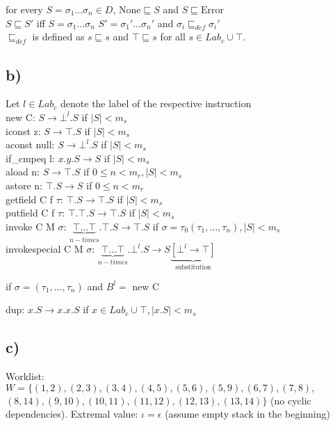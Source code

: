 \documentclass[fleqn,12pt]{article}
\begin{document}
for every $S=\sigma_1\dots\sigma_n \in D$, $\text{None} \sqsubseteq S$ and $S \sqsubseteq \text{Error}$\\
$S \sqsubseteq S'$ iff $S=\sigma_1\dots\sigma_n$ $S'=\sigma_1'\dots\sigma_n'$ and $\sigma_i \sqsubseteq_{def} \sigma_i'$\\
$\sqsubseteq_{def}$ is defined as $s \sqsubseteq s$ and $\top \sqsubseteq s$ for all $s \in Lab_c \cup \top$.
\subsection*{b)}
Let $l \in Lab_c$ denote the label of the respective instruction\\

new C: $S \rightarrow \bot^l.S$ if $|S| < m_s$\\
iconst z: $S \rightarrow \top.S$ if $|S| < m_s$\\
aconst null: $S \rightarrow \bot^l.S$ if $|S| < m_s$\\
if\_cmpeq l: $x.y.S \rightarrow S$ if $|S| < m_s$\\
aload n: $S \rightarrow \top.S$ if $0\leq n < m_r, |S| < m_s$\\
astore n: $\top.S \rightarrow S$ if $0\leq n < m_r$\\
getfield C f $\tau$: $\top.S \rightarrow \top.S$ if $|S| < m_s$\\
putfield C f $\tau$: $\top.\top.S \rightarrow \top.S$ if $|S| < m_s$ \\
invoke C M $\sigma$: $\underbrace{\top\dots\top}_{n-times}.\top.S \rightarrow \top.S$ if $\sigma = \tau_0(\tau_1,\dots,\tau_n),|S| < m_s$\\
invokespecial C M $\sigma$: $\underbrace{\top\dots\top}_{n-times}.\bot^l.S \rightarrow S\underbrace{[\bot^l \rightarrow \top]}_{\text{substitution}}$ 
\begin{flushright}
if $\sigma = (\tau_1,\dots,\tau_n)$ and $B^l =$ new C
\end{flushright}
dup: $x.S \rightarrow x.x.S$ if $x \in Lab_c \cup \top, |x.S| < m_s$\\
\subsection*{c)}
Worklist: $W = \{ (1,2),(2,3),(3,4),(4,5),(5,6),(5,9),(6,7),(7,8),$\\
$(8,14),(9,10),(10,11),(11,12),(12,13),(13,14) \}$ (no cyclic dependencies).
Extremal value: $\iota = \epsilon$ (assume empty stack in the beginning)\\
\end{document}

